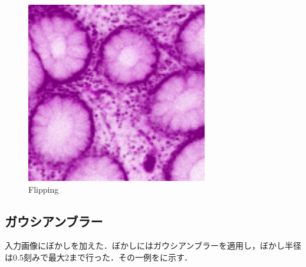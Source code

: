 \begin{figure}[H]
\begin{minipage}{0.25\columnwidth}
		\includegraphics[clip, width=\linewidth]{fig/preprocessing/data_aug/vertical_flip/vertical_flip}
	\end{minipage}
	
	\caption{Flipping}
	\label{fig:反転}
	
\end{figure}

\subsection*{ガウシアンブラー}
入力画像にぼかしを加えた．ぼかしにはガウシアンブラーを適用し，ぼかし半径は0.5刻みで最大2まで行った．その一例をに示す．

